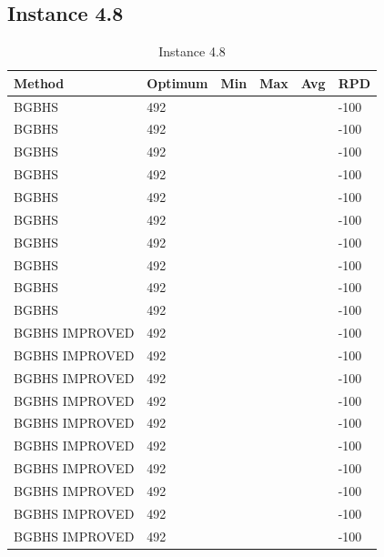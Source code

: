 \subsection{Instance 4.8}
\begin{table}[H]
\centering
\begin{tabular}{ | l | l | l | l | l | l | }
\hline
	Method & Optimum & Min & Max & Avg & RPD \\ \hline
	BGBHS & 492 &  &  &  & -100 \\ \hline
	BGBHS & 492 &  &  &  & -100 \\ \hline
	BGBHS & 492 &  &  &  & -100 \\ \hline
	BGBHS & 492 &  &  &  & -100 \\ \hline
	BGBHS & 492 &  &  &  & -100 \\ \hline
	BGBHS & 492 &  &  &  & -100 \\ \hline
	BGBHS & 492 &  &  &  & -100 \\ \hline
	BGBHS & 492 &  &  &  & -100 \\ \hline
	BGBHS & 492 &  &  &  & -100 \\ \hline
	BGBHS & 492 &  &  &  & -100 \\ \hline
	BGBHS IMPROVED & 492 &  &  &  & -100 \\ \hline
	BGBHS IMPROVED & 492 &  &  &  & -100 \\ \hline
	BGBHS IMPROVED & 492 &  &  &  & -100 \\ \hline
	BGBHS IMPROVED & 492 &  &  &  & -100 \\ \hline
	BGBHS IMPROVED & 492 &  &  &  & -100 \\ \hline
	BGBHS IMPROVED & 492 &  &  &  & -100 \\ \hline
	BGBHS IMPROVED & 492 &  &  &  & -100 \\ \hline
	BGBHS IMPROVED & 492 &  &  &  & -100 \\ \hline
	BGBHS IMPROVED & 492 &  &  &  & -100 \\ \hline
	BGBHS IMPROVED & 492 &  &  &  & -100 \\ \hline
\end{tabular}

\caption{Instance 4.8}
\label{tblscp48}
\end{table}
\newpage

